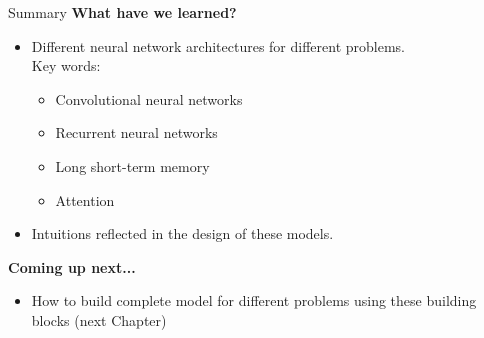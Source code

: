 

\begin{frame}{Summary}
\textbf{What have we learned?}
\begin{itemize}
\item Different neural network architectures for different problems.\\ Key words:
\begin{itemize}
\item Convolutional neural networks
\item Recurrent neural networks
\item Long short-term memory
\item Attention
\end{itemize}
\item Intuitions reflected in the design of these models.
\end{itemize}
\vsp
\textbf{Coming up next...}
\begin{itemize}
\item How to build complete model for different problems using these building blocks (next Chapter)
\end{itemize}
\end{frame}